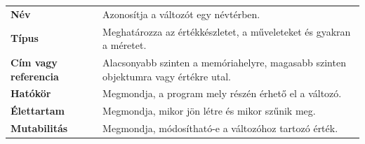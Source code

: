 \begin{tabularx}{\textwidth}{>{\bfseries}lX}
Név & Azonosítja a változót egy névtérben. \\
Típus & Meghatározza az értékkészletet, a műveleteket és gyakran a méretet. \\
Cím vagy referencia & Alacsonyabb szinten a memóriahelyre, magasabb szinten objektumra vagy értékre utal. \\
Hatókör & Megmondja, a program mely részén érhető el a változó. \\
Élettartam & Megmondja, mikor jön létre és mikor szűnik meg. \\
Mutabilitás & Megmondja, módosítható-e a változóhoz tartozó érték. \\
\end{tabularx}
